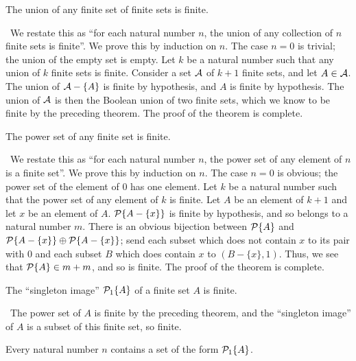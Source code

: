 \begin{thm}
 The union of any finite set of finite sets is finite.
\end{thm}

\preuve\ We restate this as ``for each natural number
$n$, the union of any collection of $n$ finite sets is finite''.  We prove this
by induction on $n$.  The case $n=0$ is trivial;
the union of the empty set is empty.  Let $k$ be a natural
number such that any union of $k$ finite sets is finite.
Consider a set $\cal A$ of $k+1$ finite sets, and let $A \in {\cal A}$.  The
union of ${\cal A}-\{A\}$ is finite by hypothesis, and $A$ is finite by
hypothesis.  The union of $\cal A$ is then the Boolean union of two finite sets, which we know to be finite by the
preceding theorem.  The proof of the theorem is complete.
\finpreuve

\begin{thm}
 The power set of any finite set is finite.
\end{thm}

\preuve\ We restate this as ``for each natural number $n$, the
power set of any element of $n$ is a finite set''.  We prove this by
induction on $n$.  The case $n=0$ is obvious; the power set of the
element of 0 has one element.  Let $k$ be a natural
number such that the power set of any element of $k$ is finite.  Let $A$ be an
element of $k+1$ and let $x$ be an element of $A$.  ${\cal P}\{A-\{x\}\}$ is 
finite by hypothesis, and so belongs to a natural number $m$.
There is an obvious bijection between ${\cal P}\{A\}$ and
${\cal P}\{A-\{x\}\}\oplus{\cal P}\{A-\{x\}\}$; send each subset
which does not contain $x$ to its pair with 0 and each subset $B$ which does
contain $x$ to $(B-\{x\},1)$.  Thus, we see that ${\cal P}\{A\}\in
m+m$, and so is finite.  The proof of the theorem is complete.
\finpreuve

\begin{thm}
 The ``singleton image'' ${\cal P}_1\{A\}$ of a finite
 set $A$ is finite.
\end{thm}

\preuve\ The power set of $A$ is finite by the preceding
theorem, and the ``singleton image'' of $A$ is a subset of this finite set, so
finite.
\finpreuve

\begin{thm}
 Every natural number $n$ contains a set of the form
 ${\cal P}_1\{A\}$.
\end{thm}

